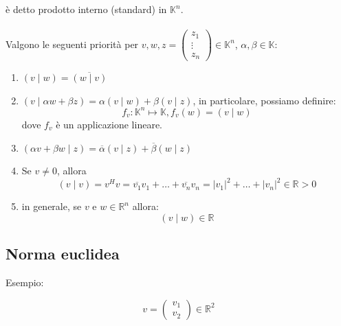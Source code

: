 \documentclass[12pt]{article}
\begin{document}
è detto prodotto interno (standard) in $\mathbb{K}^n$.
\\\\
Valgono le seguenti priorità per $v, w, z = \begin{pmatrix}
    z_1\\
    \vdots\\
    z_n
\end{pmatrix} \in \mathbb{K}^n$,  $\alpha, \beta \in  \mathbb{K}$:

\begin{enumerate}
    \item $(v \mid w) = \overline{(w \mid v)}$
    \item $(v \mid \alpha w + \beta z) = \alpha(v \mid w) + \beta(v \mid z)$, in particolare, possiamo definire:
    \[f_v : \mathbb{K}^n \mapsto \mathbb{K}, f_v(w) = (v \mid w)\]
    dove $f_v$ è un applicazione lineare.
    \item $(\alpha v + \beta w \mid z) = \overline{\alpha} (v \mid z) + \overline{\beta} (w \mid z)$
    \item Se $v \neq 0$, allora
    \[(v \mid v) = v^Hv = \overline{v_1}v_1 + \dots + \overline{v_n}v_n = |v_1|^2 + \dots + |v_n|^2 \in \mathbb{R} > 0\]
    \item in generale, se $v$ e $w \in \mathbb{R}^n$ allora:
    \[(v \mid w) \in \mathbb{R}\]
\end{enumerate}


\subsection{Norma euclidea}

Esempio:

\[v = \begin{pmatrix}
    v_1\\
    v_2
\end{pmatrix} \in \mathbb{R}^2 \]

\begin{figure}[H]
\centering
{}
\end{figure}
\end{document}
